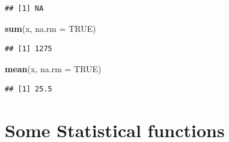 \documentclass[
]{book}
\newenvironment{Shaded}{\begin{snugshade}}{\end{snugshade}}
\newcommand{\AttributeTok}[1]{\textcolor[rgb]{0.13,0.29,0.53}{#1}}
\newcommand{\ConstantTok}[1]{\textcolor[rgb]{0.56,0.35,0.01}{#1}}
\newcommand{\FunctionTok}[1]{\textcolor[rgb]{0.13,0.29,0.53}{\textbf{#1}}}
\newcommand{\NormalTok}[1]{#1}
\begin{document}
\begin{verbatim}
## [1] NA
\end{verbatim}

\begin{Shaded}
\begin{Highlighting}[]
\FunctionTok{sum}\NormalTok{(x, }\AttributeTok{na.rm =} \ConstantTok{TRUE}\NormalTok{)}
\end{Highlighting}
\end{Shaded}

\begin{verbatim}
## [1] 1275
\end{verbatim}

\begin{Shaded}
\begin{Highlighting}[]
\FunctionTok{mean}\NormalTok{(x, }\AttributeTok{na.rm =} \ConstantTok{TRUE}\NormalTok{)}
\end{Highlighting}
\end{Shaded}

\begin{verbatim}
## [1] 25.5
\end{verbatim}

\hypertarget{some-statistical-functions}{%
\section{Some Statistical functions}\label{some-statistical-functions}}
\end{document}
